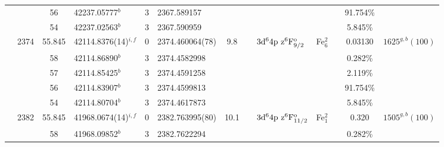 \begin{table*}
\begin{center}
{\begin{tabular}{:l;l;c;l;c;l;c;l;l;c;c;c;c}
\rowstyle{\itshape}               &        & 56        & 42237.05777$^{b}$                & 3 &   2367.589157      &      & $                                        $ & $                                        $ &             &              & 91.754\%  & $     ^{}     $\\
\rowstyle{\itshape}               &        & 54        & 42237.02563$^{b}$                & 3 &   2367.590959      &      & $                                        $ & $                                        $ &             &              & 5.845\%   & $     ^{}     $\\
                                  & 2374   & 55.845    & 42114.8376(14)$^{i,f}$           & 0 &   2374.460064(78)  &  9.8 & $                                        $ & $3\rm{d}^64\rm{p~z}^6\rm{F}_{9/2}^{\rm o}$ & Fe$^2_{6}$  &              & 0.03130   & $ 1625^{g,b}(100)$\\
\rowstyle{\itshape}               &        & 58        & 42114.86890$^{b}$                & 3 &  2374.4582998      &      & $                                        $ & $                                        $ &             &              & 0.282\%   & $     ^{}     $\\
\rowstyle{\itshape}               &        & 57        & 42114.85425$^{b}$                & 3 &  2374.4591258      &      & $                                        $ & $                                        $ &             &              & 2.119\%   & $     ^{}     $\\
\rowstyle{\itshape}               &        & 56        & 42114.83907$^{b}$                & 3 &  2374.4599813      &      & $                                        $ & $                                        $ &             &              & 91.754\%  & $     ^{}     $\\
\rowstyle{\itshape}               &        & 54        & 42114.80704$^{b}$                & 3 &  2374.4617873      &      & $                                        $ & $                                        $ &             &              & 5.845\%   & $     ^{}     $\\
                                  & 2382   & 55.845    & 41968.0674(14)$^{i,f}$           & 0 &   2382.763995(80)  & 10.1 & $                                        $ & $3\rm{d}^64\rm{p~z}^6\rm{F}_{11/2}^{\rm o}$ & Fe$^2_{1}$  &              & 0.320     & $ 1505^{g,b}(100)$\\
\rowstyle{\itshape}               &        & 58        & 41968.09852$^{b}$                & 3 &  2382.7622294      &      & $                                        $ & $                                        $ &             &              & 0.282\%   & $     ^{}     $\\

\end{tabular}}
\end{center}
\end{table*}
